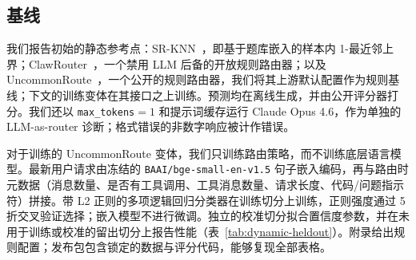 \subsection{基线}
\label{sec:baselines}

我们报告初始的静态参考点：SR-KNN~\citep{liu2026vllmsemanticrouter}，即基于题库嵌入的样本内 1-最近邻上界；ClawRouter~\citep{clawrouter}，一个禁用 LLM 后备的开放规则路由器；以及 UncommonRoute~\citep{uncommonroute}，一个公开的规则路由器，我们将其上游默认配置作为规则基线；下文的训练变体在其接口之上训练。预测均在离线生成，并由公开评分器打分。我们还以 \texttt{max\_tokens}$=1$ 和提示词缓存运行 Claude Opus 4.6，作为单独的 LLM-as-router 诊断；格式错误的非数字响应被计作错误。

对于训练的 UncommonRoute 变体，我们只训练路由策略，而不训练底层语言模型。最新用户请求由冻结的 \texttt{BAAI/bge-small-en-v1.5} 句子嵌入编码，再与路由时元数据（消息数量、是否有工具调用、工具消息数量、请求长度、代码/问题指示符）拼接。带 L2 正则的多项逻辑回归分类器在训练切分上训练，正则强度通过 5 折交叉验证选择；嵌入模型不进行微调。独立的校准切分拟合置信度参数，并在未用于训练或校准的留出切分上报告性能（表~\ref{tab:dynamic-heldout}）。附录给出规则配置；发布包包含锁定的数据与评分代码，能够复现全部表格。
